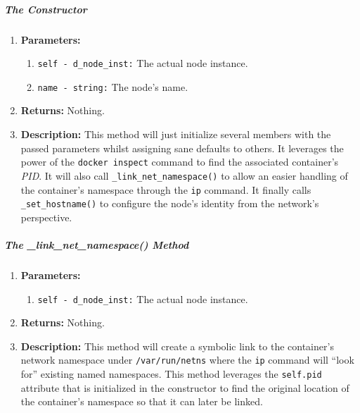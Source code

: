         \subparagraph{The Constructor}
            \begin{enumerate}
                \item \textbf{Parameters:}
                \begin{enumerate}
                    \item \texttt{self - d\_node\_inst:} The actual node instance.
                    \item \texttt{name - string:} The node's name.
                \end{enumerate}
                \item \textbf{Returns:} Nothing.
                \item \textbf{Description:} This method will just initialize several members with the passed parameters whilst assigning sane defaults to others. It leverages the power of the \texttt{docker inspect} command to find the associated container's \textit{PID}. It will also call \texttt{\_link\_net\_namespace()} to allow an easier handling of the container's namespace through the \texttt{ip} command. It finally calls \texttt{\_set\_hostname()} to configure the node's identity from the network's perspective.
            \end{enumerate}

        \subparagraph{The \_link\_net\_namespace() Method}
            \begin{enumerate}
                \item \textbf{Parameters:}
                \begin{enumerate}
                    \item \texttt{self - d\_node\_inst:} The actual node instance.
                \end{enumerate}
                \item \textbf{Returns:} Nothing.
                \item \textbf{Description:} This method will create a symbolic link to the container's network namespace under \texttt{/var/run/netns} where the \texttt{ip} command will ``look for'' existing named namespaces. This method leverages the \texttt{self.pid} attribute that is initialized in the constructor to find the original location of the container's namespace so that it can later be linked.
            \end{enumerate}

